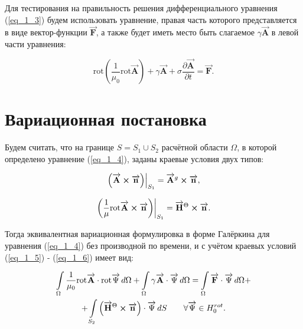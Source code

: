 Для тестирования на правильность решения дифференциального уравнения (\ref{eq_1_3}) будем использовать уравнение, правая часть которого представляется в виде вектор-функции $\overrightarrow{\textbf{F}}$, а также будет иметь место быть слагаемое $\gamma \overrightarrow{\textbf{A}}$ в левой части уравнения:

\begin{equation} \label{eq_1_4}
	\text{rot} \left( \frac{1}{\mu_0} \text{rot} \overrightarrow{\textbf{A}} \right) + \gamma \overrightarrow{\textbf{A}} + \sigma \frac{\partial \overrightarrow{\textbf{A}}}{\partial t} = \overrightarrow{\textbf{F}}.
\end{equation}


\section{Вариационная постановка}

Будем считать, что на границе $S = S_1 \cup S_2$ расчётной области $\Omega$, в которой определено уравнение (\ref{eq_1_4}), заданы краевые условия двух типов:

\begin{equation} \label{eq_1_5}
	\left. \left( \overrightarrow{\textbf{A}} \cross \overrightarrow{\textbf{n}}  \right) \right|_{S_1} = \overrightarrow{\textbf{A}}^g \cross \overrightarrow{\textbf{n}},
\end{equation}

\begin{equation} \label{eq_1_6}
	\left. \left( \frac{1}{\mu} \text{rot} \overrightarrow{\textbf{A}} \cross \overrightarrow{\textbf{n}}  \right) \right|_{S_1} = \overrightarrow{\textbf{H}}^{\Theta} \cross \overrightarrow{\textbf{n}}.
\end{equation}

Тогда эквивалентная вариационная формулировка в форме Галёркина для уравнения (\ref{eq_1_4}) без производной по времени, и с учётом краевых условий (\ref{eq_1_5}) - (\ref{eq_1_6}) имеет вид:

\begin{equation} \label{eq_1_7}
\begin{gathered}
	\int \limits_{\Omega} \frac{1}{\mu_0} \text{rot} \overrightarrow{\textbf{A}} \cdot \text{rot} \overrightarrow{\textbf{$\Psi$}} \, d \Omega + \int \limits_{\Omega} \gamma \overrightarrow{\textbf{A}} \cdot \overrightarrow{\textbf{$\Psi$}} \, d \Omega = \int \limits_{\Omega} \overrightarrow{\textbf{F}} \cdot \overrightarrow{\textbf{$\Psi$}} \, d \Omega + \\ + \int \limits_{S_2} \left( \overrightarrow{\textbf{H}}^{\Theta} \cross \overrightarrow{\textbf{n}} \right) \cdot \overrightarrow{\textbf{$\Psi$}} \, d S \qquad \forall \overrightarrow{\textbf{$\Psi$}} \in H^{rot}_0.
\end{gathered}
\end{equation}


